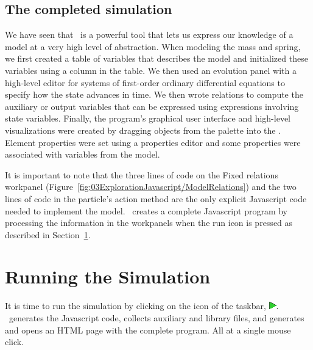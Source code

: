 \subsection{The completed simulation}

We have seen that \Ejs\ is a powerful tool that lets us express our knowledge of a model at a very high level of abstraction. When modeling the mass and spring, we first created a table of variables that describes the model and initialized these variables using a column in the table. We then used an evolution panel with a high-level editor for systems of first-order ordinary differential equations to specify how the state advances in time. We then wrote relations to compute the auxiliary or output variables that can be expressed using expressions involving state variables.  Finally, the program's graphical user interface and high-level visualizations were created by dragging objects from the  palette into the . Element properties were set using a properties editor and some properties were associated with variables from the model.

It is important to note that the three lines of  code on the Fixed relations workpanel (Figure~\ref{fig:03ExplorationJavascript/ModelRelations}) and the two lines of code in the particle's action method are the only explicit Javascript code needed to implement the model.  \Ejs\ creates a complete Javascript program by processing the information in the workpanels when the run icon is pressed as described in Section~\ref{section:03ExplorationJavascriptRunning}.

\section{Running the Simulation}\label{section:03ExplorationJavascriptRunning}

It is time to run the simulation by clicking on the  icon of the taskbar, \includegraphics[scale=\linescale]{../_common/icons_png/launch.png}.  \ejs\ generates the Javascript code, collects auxiliary and library files, and generates and opens an HTML page with the complete program. All at a single mouse click.

